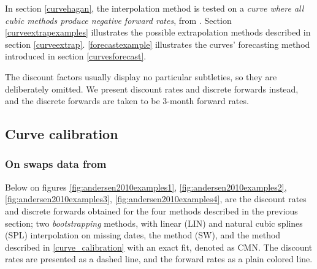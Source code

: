 \medskip

In section \ref{curvehagan}, the interpolation method is tested on a \textit{curve where all cubic methods produce negative forward rates}, from \cite{hagan2006interpolation}. Section \ref{curveextrapexamples} illustrates the possible extrapolation methods described in  section \ref{curveextrap}. \ref{forecastexample} illustrates the curves' forecasting method introduced in section \ref{curvesforecast}.

\medskip

The discount factors usually display no particular subtleties, so they are deliberately omitted. We present discount rates and discrete forwards instead, and the discrete forwards are taken to be 3-month forward rates.

\subsection{Curve calibration}

\subsubsection{On swaps data from \cite{andersen2010interest}}
\label{andersen2010examples}

Below on figures \ref{fig:andersen2010examples1}, \ref{fig:andersen2010examples2}, \ref{fig:andersen2010examples3}, \ref{fig:andersen2010examples4},  are the discount rates and discrete forwards obtained for the four methods described in the previous section; two \textit{bootstrapping} methods, with linear (LIN) and natural cubic splines (SPL) interpolation on missing dates, the \cite{smithwilson2001} method (SW), and the method described in \ref{curve_calibration} with an exact fit, denoted as CMN. The discount rates are presented as a dashed line, and the forward rates as a plain colored line.


